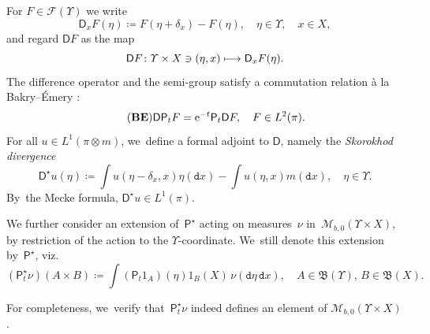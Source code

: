 \documentclass[JEP,XML,SOM,Unicode,published]{cedram}
\newcommand\mto{\mathchoice{\longmapsto}{\mapsto}{\mapsto}{\mapsto}}
\theoremstyle{definition}
\theoremstyle{remark}
\begin{document}
For $F \in \mathscr{F}(\varUpsilon)$ we write
\begin{equation*}
\mathsf{D}_{x} F(\eta) \coloneq F(\eta + \delta_{x}) - F(\eta), \quad \eta \in \varUpsilon,\quad x \in X,
\end{equation*}
and regard $\mathsf{D} F$ as the map
\begin{equation*}
\mathsf{D} F \colon \varUpsilon \times X \ni (\eta, x) \mto \mathsf{D}_{x} F(\eta).
\end{equation*}
The difference operator and the semi-group satisfy a commutation relation à la Bakry--Émery \cite[Lem.\,6]{LastAnaSto}:
\begin{equation}\tag{$\mathbf{BE}$}\label{e:be}
\mathsf{D} \mathsf{P}_{t} F = \mathrm{e}^{-t} \mathsf{P}_{t} \mathsf{D} F, \quad F \in L^{2}(\pi).
\end{equation}
For all $u \in L^{1}(\pi \otimes m)$, we~define a formal adjoint to $\mathsf{D}$, namely the \emph{Skorokhod divergence}
\begin{equation*}
\mathsf{D}^{\star} u(\eta) \coloneq \int u(\eta - \delta_{x}, x) \eta(\mathtt{d} x) - \int u(\eta, x) m(\mathtt{d} x), \quad \eta \in \varUpsilon.
\end{equation*}
By~the Mecke formula, $\mathsf{D}^{\star} u \in L^{1}(\pi)$.

We further consider an extension of~$\mathsf{P}^{\star}$ acting on measures~$\nu$ in~$\mathscr{M}_{b,0}(\varUpsilon \times X)$, by restriction of the action to the $\varUpsilon$-coordinate. We~still denote this extension by~$\mathsf{P}^{\star}$, viz.
\begin{equation*}
(\mathsf{P}^{\star}_{t} \nu)(A \times B) \coloneq \int (\mathsf{P}_t 1_{A})(\eta) 1_{B}(X) \, \nu(\mathtt{d} \eta\, \mathtt{d} x), \quad A \in \mathfrak{B}(\varUpsilon),\, B \in \mathfrak{B}(X).
\end{equation*}

For completeness, we~verify that~$\mathsf{P}^{\star}_t\nu$ indeed defines an element of $\mathscr{M}_{b,0}(\varUpsilon \times X)$.
\end{document}

